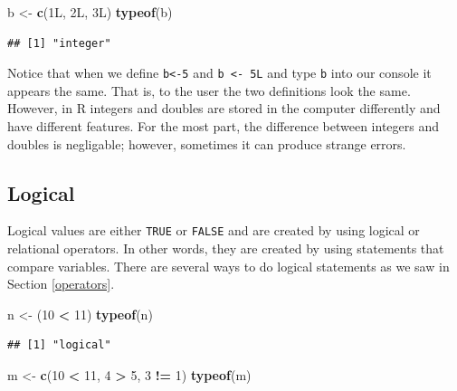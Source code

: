 \documentclass[
]{book}
\newenvironment{Shaded}{\begin{snugshade}}{\end{snugshade}}
\newcommand{\DecValTok}[1]{\textcolor[rgb]{0.00,0.00,0.81}{#1}}
\newcommand{\KeywordTok}[1]{\textcolor[rgb]{0.13,0.29,0.53}{\textbf{#1}}}
\newcommand{\NormalTok}[1]{#1}
\newcommand{\OperatorTok}[1]{\textcolor[rgb]{0.81,0.36,0.00}{\textbf{#1}}}
\newcommand{\StringTok}[1]{\textcolor[rgb]{0.31,0.60,0.02}{#1}}
\begin{document}
\begin{Shaded}
\begin{Highlighting}[]
\NormalTok{b <-}\StringTok{ }\KeywordTok{c}\NormalTok{(1L, 2L, 3L)}
\KeywordTok{typeof}\NormalTok{(b)}
\end{Highlighting}
\end{Shaded}

\begin{verbatim}
## [1] "integer"
\end{verbatim}

Notice that when we define \texttt{b\textless{}-5} and \texttt{b\ \textless{}-\ 5L} and type \texttt{b} into our console it appears the same. That is, to the user the two definitions look the same. However, in R integers and doubles are stored in the computer differently and have different features. For the most part, the difference between integers and doubles is negligable; however, sometimes it can produce strange errors.

\hypertarget{logical}{%
\subsection*{Logical}\label{logical}}

Logical values are either \texttt{TRUE} or \texttt{FALSE} and are created by using logical or relational operators. In other words, they are created by using statements that compare variables. There are several ways to do logical statements as we saw in Section \ref{operators}.

\begin{Shaded}
\begin{Highlighting}[]
\NormalTok{n <-}\StringTok{ }\NormalTok{(}\DecValTok{10} \OperatorTok{<}\StringTok{ }\DecValTok{11}\NormalTok{)}
\KeywordTok{typeof}\NormalTok{(n)}
\end{Highlighting}
\end{Shaded}

\begin{verbatim}
## [1] "logical"
\end{verbatim}

\begin{Shaded}
\begin{Highlighting}[]
\NormalTok{m <-}\StringTok{ }\KeywordTok{c}\NormalTok{(}\DecValTok{10} \OperatorTok{<}\StringTok{ }\DecValTok{11}\NormalTok{, }\DecValTok{4} \OperatorTok{>}\StringTok{ }\DecValTok{5}\NormalTok{,}
    \DecValTok{3} \OperatorTok{!=}\StringTok{ }\DecValTok{1}\NormalTok{)}
\KeywordTok{typeof}\NormalTok{(m)}
\end{Highlighting}
\end{Shaded}
\end{document}
